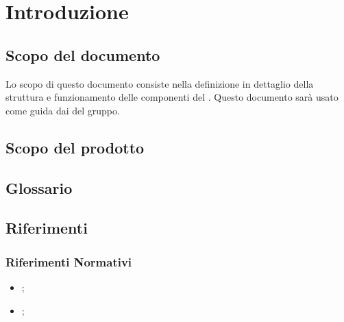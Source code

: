 \section{Introduzione}
	\subsection{Scopo del documento}
	Lo scopo di questo documento consiste nella definizione in dettaglio della struttura e funzionamento delle componenti del  \PROGETTO.
	Questo documento sarà usato come guida dai \PRP{} del gruppo.
	\subsection{Scopo del prodotto}
		\SCOPO
	\subsection{Glossario}
		\GLOSSARIO
	\subsection{Riferimenti}
	  \subsubsection{Riferimenti Normativi}
	    \begin{itemize}
		  \item \NPdoc{};
		  \item \ARdoc{};
	    \end{itemize}
